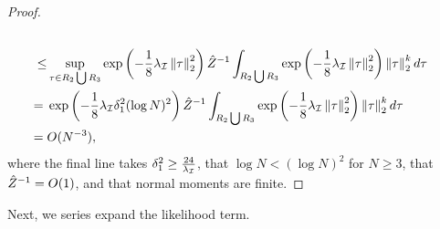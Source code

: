 \begin{lem}
\begin{proof}
\begin{align*}
\\\le&
\sup_{\tau \in R_2 \bigcup R_3}
    \exp\left(-\frac{1}{8} \infoev \norm{\tau}_2^2 \right)
\normalizer^{-1} \int_{R_2 \bigcup R_3}
        \exp\left(-\frac{1}{8} \infoev \norm{\tau}_2^2 \right)
            \norm{\tau}^k_2 d\tau
\\={}&
\exp\left(-\frac{1}{8} \infoev \delta_1^2 (\log N)^2 \right)
\normalizer^{-1} \int_{R_2 \bigcup R_3}
        \exp\left(-\frac{1}{8} \infoev \norm{\tau}_2^2 \right)
            \norm{\tau}^k_2 d\tau
\\={}& O(N^{-3}),
%
\end{align*}
%
where the final line takes $\delta_1^2 \ge \frac{24}{\lambda_\mathcal{I}}$, that $\log N <
(\log N)^2$ for $N \ge 3$, that $\hat{Z}^{-1} = O(1)$, and that normal
moments are finite.
%
\end{proof}
%
\end{lem}


Next, we series expand the likelihood term.

